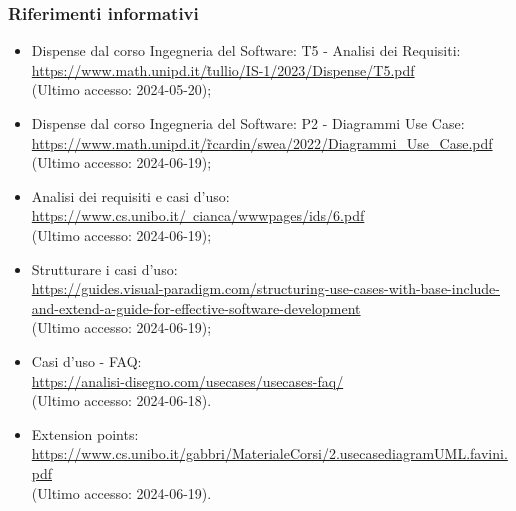 \subsubsection{Riferimenti informativi}
\begin{itemize}
  \item Dispense dal corso Ingegneria del Software: T5 - Analisi dei Requisiti:\\ \href{https://www.math.unipd.it/~tullio/IS-1/2023/Dispense/T5.pdf}{https://www.math.unipd.it/\~tullio/IS-1/2023/Dispense/T5.pdf}  \\ (Ultimo accesso: 2024-05-20);
  \item Dispense dal corso Ingegneria del Software: P2 - Diagrammi Use Case:\\ \href{https://www.math.unipd.it/~rcardin/swea/2022/Diagrammi%20Use%20Case.pdf}{https://www.math.unipd.it/\~rcardin/swea/2022/Diagrammi\_Use\_Case.pdf}  \\ (Ultimo accesso: 2024-06-19);
  \item Analisi dei requisiti e casi d'uso:\\ \href{https://www.cs.unibo.it/~cianca/wwwpages/ids/6.pdf}{https://www.cs.unibo.it/~cianca/wwwpages/ids/6.pdf}  \\ (Ultimo accesso: 2024-06-19);
  \item Strutturare i casi d'uso:\\ \href{https://guides.visual-paradigm.com/structuring-use-cases-with-base-include-and-extend-a-guide-for-effective-software-development}{https://guides.visual-paradigm.com/structuring-use-cases-with-base-include-and-extend-a-guide-for-effective-software-development}  \\ (Ultimo accesso: 2024-06-19);
  \item Casi d'uso - FAQ:\\ \href{https://analisi-disegno.com/usecases/usecases-faq}{https://analisi-disegno.com/usecases/usecases-faq/}  \\ (Ultimo accesso: 2024-06-18).
  \item Extension points:\\ \href{https://www.cs.unibo.it/gabbri/MaterialeCorsi/2.usecasediagramUML.favini.pdf}{https://www.cs.unibo.it/gabbri/MaterialeCorsi/2.usecasediagramUML.favini.pdf}  \\ (Ultimo accesso: 2024-06-19).
\end{itemize}
